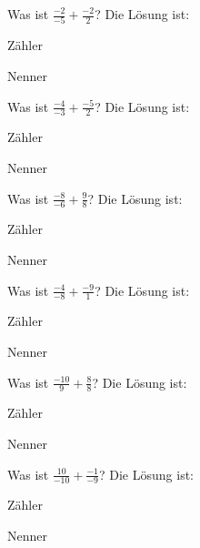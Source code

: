 \documentclass{ximera}
\begin{document}
\begin{shuffle}
\begin{question}
Was ist $\frac{-2}{-5} + \frac{-2}{2}$?
Die Lösung ist:
\begin{solution}
Zähler 
\end{solution}
\begin{solution}
Nenner 
\end{solution}
\end{question}


\begin{question}
Was ist $\frac{-4}{-3} + \frac{-5}{2}$?
Die Lösung ist:
\begin{solution}
Zähler 
\end{solution}
\begin{solution}
Nenner 
\end{solution}
\end{question}


\begin{question}
Was ist $\frac{-8}{-6} + \frac{9}{8}$?
Die Lösung ist:
\begin{solution}
Zähler 
\end{solution}
\begin{solution}
Nenner 
\end{solution}
\end{question}


\begin{question}
Was ist $\frac{-4}{-8} + \frac{-9}{1}$?
Die Lösung ist:
\begin{solution}
Zähler 
\end{solution}
\begin{solution}
Nenner 
\end{solution}
\end{question}


\begin{question}
Was ist $\frac{-10}{9} + \frac{8}{8}$?
Die Lösung ist:
\begin{solution}
Zähler 
\end{solution}
\begin{solution}
Nenner 
\end{solution}
\end{question}


\begin{question}
Was ist $\frac{10}{-10} + \frac{-1}{-9}$?
Die Lösung ist:
\begin{solution}
Zähler 
\end{solution}
\begin{solution}
Nenner 
\end{solution}
\end{question}



\end{shuffle}
\end{document}
